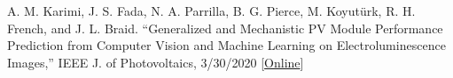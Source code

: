 \documentclass[10pt]{article}
\begin{document}
{\begin{newitemize}
	\item{A. M. Karimi, J. S. Fada, N. A. Parrilla, { B. G. Pierce}, M. Koyutürk, R. H. French, and J. L. Braid. ``Generalized and Mechanistic PV Module Performance Prediction from Computer Vision and Machine Learning on Electroluminescence Images,'' IEEE J. of Photovoltaics, 3/30/2020 
	[\href{https://ieeexplore.ieee.org/abstract/document/9050914/}{Online}]}
    
%    
    
    

    
    
    
    
    
    
    
    

\end{newitemize}}
\end{document}
